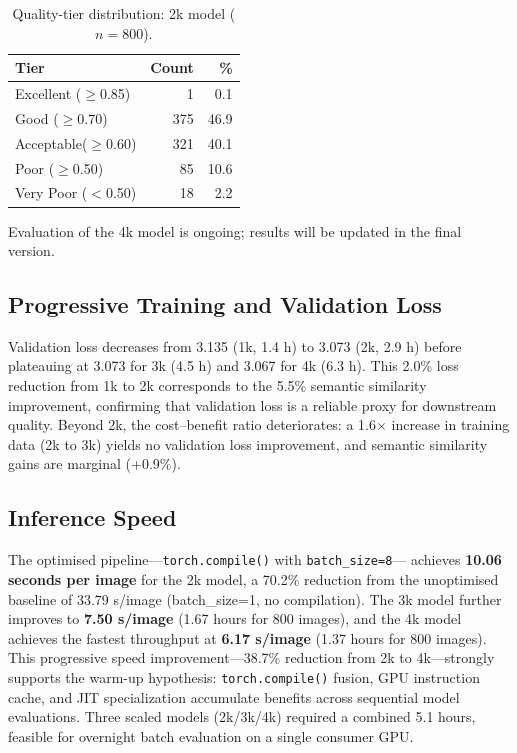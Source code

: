 \documentclass[twocolumn]{article}
\begin{document}
\begin{table}[h]
\centering
\caption{Quality-tier distribution: 2k model ($n=800$).}
\label{tab:tier_2k}
\setlength{\tabcolsep}{4pt}
\begin{tabular}{lrr}
\toprule
Tier & Count & \% \\
\midrule
Excellent ($\geq$0.85) &   1 &  0.1 \\
Good      ($\geq$0.70) & 375 & 46.9 \\
Acceptable($\geq$0.60) & 321 & 40.1 \\
Poor      ($\geq$0.50) &  85 & 10.6 \\
Very Poor ($<$0.50)    &  18 &  2.2 \\
\bottomrule
\end{tabular}
\end{table}

Evaluation of the 4k model is ongoing; results will be updated in
the final version.

\subsection{Progressive Training and Validation Loss}

Validation loss decreases from 3.135 (1k, 1.4 h) to 3.073 (2k, 2.9 h)
before plateauing at 3.073 for 3k (4.5 h) and 3.067 for 4k (6.3 h).
This 2.0\% loss reduction from 1k to 2k corresponds to the 5.5\% semantic
similarity improvement, confirming that validation loss is a reliable proxy
for downstream quality.
Beyond 2k, the cost--benefit ratio deteriorates: a 1.6$\times$ increase in
training data (2k to 3k) yields no validation loss improvement, and semantic
similarity gains are marginal (+0.9\%).

\subsection{Inference Speed}

The optimised pipeline---\texttt{torch.compile()} with \texttt{batch\_size=8}---
achieves \textbf{10.06 seconds per image} for the 2k model, a 70.2\% reduction
from the unoptimised baseline of 33.79 s/image (batch\_size=1, no compilation).
The 3k model further improves to \textbf{7.50 s/image} (1.67 hours for 800 images),
and the 4k model achieves the fastest throughput at \textbf{6.17 s/image}
(1.37 hours for 800 images).
This progressive speed improvement---38.7\% reduction from 2k to 4k---strongly
supports the warm-up hypothesis: \texttt{torch.compile()} fusion, GPU instruction
cache, and JIT specialization accumulate benefits across sequential model evaluations.
Three scaled models (2k/3k/4k) required a combined 5.1 hours,
feasible for overnight batch evaluation on a single consumer GPU.
\end{document}

